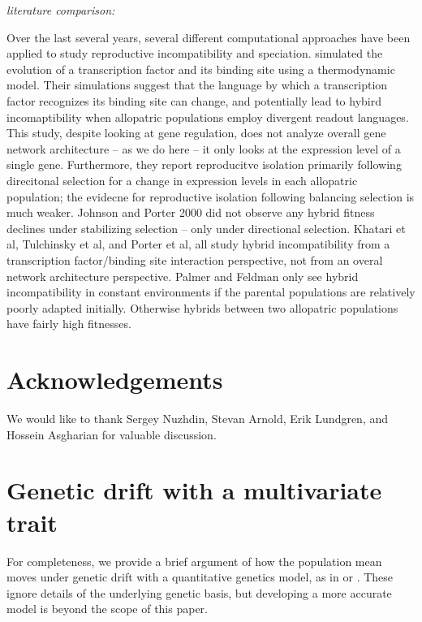 \documentclass[9 pt]{article}
\newcommand{\jss}[1]{{\color{olive}\it #1}}
\newcommand{\1}{\mathbbm{1}}
\begin{document}
  \jss{literature comparison:}

  Over the last several years, several different computational approaches have been applied to study reproductive incompatibility and speciation. \citet{tulchinsky } simulated the evolution of a transcription factor and its binding site using a thermodynamic model. Their simulations suggest that the language by which a transcription factor recognizes its binding site can change, and potentially lead to hybird incomaptibility when allopatric populations employ divergent readout languages. This study, despite looking at gene regulation, does not analyze overall gene network architecture -- as we do here -- it only looks at the expression level of a single gene. Furthermore, they report reproducitve isolation primarily following direcitonal selection for a change in expression levels in each allopatric population; the evidecne for reproductive isolation following balancing selection is much weaker. Johnson and Porter 2000 did not observe any hybrid fitness declines under stabilizing selection -- only under directional selection. 
  Khatari et al, Tulchinsky et al, and Porter et al, all study hybrid incompatibility from a transcription factor/binding site interaction perspective, not from an overal network architecture perspective. Palmer and Feldman only see hybrid incompatibility in constant environments if the parental populations are relatively poorly adapted initially. Otherwise hybrids between two allopatric populations have fairly high fitnesses.  

\section*{Acknowledgements}
We would like to thank Sergey Nuzhdin, Stevan Arnold, Erik Lundgren, and Hossein Asgharian for valuable discussion.




\normalsize
\appendix

\section{Genetic drift with a multivariate trait}
\label{ss:quant_gen}

For completeness, we provide a brief argument of how the population mean
moves under genetic drift
with a quantitative genetics model,
as in \citet{lande1981models} or \citet{hansen1996translating}.
These ignore details of the underlying genetic basis,
but developing a more accurate model is beyond the scope of this paper.
\end{document}
